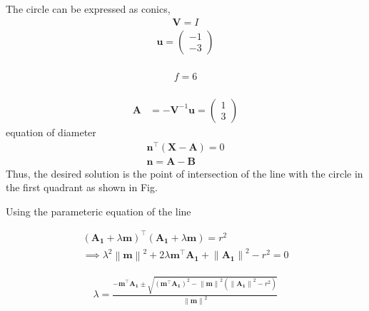 \documentclass[journal,10pt,twocolumn]{article}
\newcommand{\myvec}[1]{\ensuremath{\begin{pmatrix}#1\end{pmatrix}}}
\providecommand{\brak}[1]{\ensuremath{\left(#1\right)}}
\providecommand{\brak}[1]{\ensuremath{\left(#1\right)}}
\providecommand{\norm}[1]{\left\lVert#1\right\rVert}
\numberwithin{equation}{subsection}
\let\vec\mathbf
\begin{document}
 The circle can be expressed as conics,
 \\
 \begin{align}
      \vec{V} = I 
 \end{align}
   \begin{align}
\vec{u} = \myvec{-1 \\ -3}  
   \end{align}
   \\
   \begin{align}
       f=6
   \end{align}
   \\
   \begin{align}
        \vec{A} &= - \vec{V}^{-1}\vec{u}
         = \myvec{1 \\ 3}
   \end{align}
    \textbf{} equation of diameter
         \begin{align}
           \vec{n}^{\top} (\vec{X}-\vec{A})=0
           \\
           \vec{n}=\vec{A}-\vec{B}
         \end{align}
 Thus, the desired solution is the point of intersection of the line with the circle in the first quadrant as shown in Fig.  
	  
		    Using the parameteric equation of the line 
		 
		    \begin{multline}
    			   \brak{ \vec{A_1} + \lambda \vec{m}}^{\top}
			    \brak{ \vec{A_1} + \lambda \vec{m}}
			    = r^2
			    \\
			    \implies \lambda^2\norm{\vec{m}}^2+ 2 \lambda \vec{m}^{\top}\vec{A_1}
			    +\norm{\vec{A_1}}^2 - r^2 = 0
		    \end{multline}
		  
		    \begin{align}
		\lambda = \frac{-\vec{m}^{\top}\vec{A_1}\pm \sqrt{\brak{\vec{m}^{\top}\vec{A_1}}^2 -\norm{\vec{m}}^2\brak{\norm{\vec{A_1}}^2 - r^2 }}}{\norm{\vec{m}}^2}
		    \end{align}
	
\end{document}
